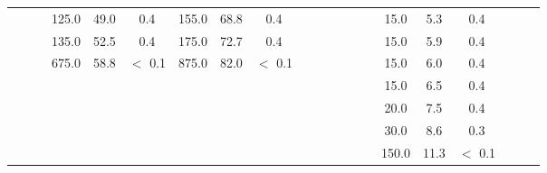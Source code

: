 \begin{landscape}
\begin{table}
{\begin{tabular}{ccc:ccc:ccc:ccc:ccc:ccc:ccc}
	\NA{} & \NA{} & \NA{} & 125.0 & 49.0 & 0.4 & 155.0 & 68.8 & 0.4 & \NA{} & \NA{} & \NA{} & \NA{} & \NA{} & \NA{} & 15.0 & 5.3 & 0.4 & \NA{} & \NA{} & \NA{}  \\ 
	\NA{} & \NA{} & \NA{} & 135.0 & 52.5 & 0.4 & 175.0 & 72.7 & 0.4 & \NA{} & \NA{} & \NA{} & \NA{} & \NA{} & \NA{} & 15.0 & 5.9 & 0.4 & \NA{} & \NA{} & \NA{}  \\ 
	\NA{} & \NA{} & \NA{} & 675.0 & 58.8 & $<$ 0.1 & 875.0 & 82.0 & $<$ 0.1 & \NA{} & \NA{} & \NA{} & \NA{} & \NA{} & \NA{} & 15.0 & 6.0 & 0.4 & \NA{} & \NA{} & \NA{}  \\ 
	\NA{} & \NA{} & \NA{} & \NA{} & \NA{} & \NA{} & \NA{} & \NA{} & \NA{} & \NA{} & \NA{} & \NA{} & \NA{} & \NA{} & \NA{} & 15.0 & 6.5 & 0.4 & \NA{} & \NA{} & \NA{}  \\ 
	\NA{} & \NA{} & \NA{} & \NA{} & \NA{} & \NA{} & \NA{} & \NA{} & \NA{} & \NA{} & \NA{} & \NA{} & \NA{} & \NA{} & \NA{} & 20.0 & 7.5 & 0.4 & \NA{} & \NA{} & \NA{}  \\ 
	\NA{} & \NA{} & \NA{} & \NA{} & \NA{} & \NA{} & \NA{} & \NA{} & \NA{} & \NA{} & \NA{} & \NA{} & \NA{} & \NA{} & \NA{} & 30.0 & 8.6 & 0.3 & \NA{} & \NA{} & \NA{}  \\ 
	\NA{} & \NA{} & \NA{} & \NA{} & \NA{} & \NA{} & \NA{} & \NA{} & \NA{} & \NA{} & \NA{} & \NA{} & \NA{} & \NA{} & \NA{} & 150.0 & 11.3 & $<$ 0.1 & \NA{} & \NA{} & \NA{}  \\ 
	\end{tabular}%
}
\end{table}
\end{landscape}
